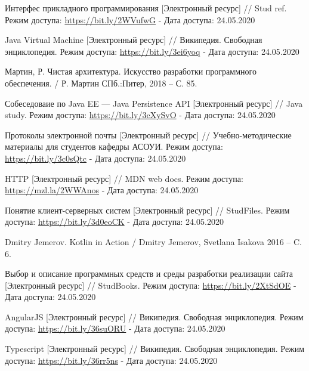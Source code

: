 \begingroup
\begin{thebibliography}{11}

    Интерфес прикладного программирования
    [Электронный ресурс] //
    Stud ref. 
    Режим доступа: \url{https://bit.ly/2WVufwG} -
    Дата доступа: 24.05.2020

    Java Virtual Machine
    [Электронный ресурс] //
    Википедия. Свободная энциклопедия. 
    Режим доступа: \url{https://bit.ly/3ei6yoq} -
    Дата доступа: 24.05.2020

    Мартин, Р.
    Чистая архитектура. Искусство разработки программного обеспечения. /
    Р. Мартин 
    СПб.:Питер, 2018 -- С. 85.

    Собеседоваие по Java EE --- Java Persistence API
    [Электронный ресурс] //
    Java study. 
    Режим доступа: \url{https://bit.ly/3cXySvO} -
    Дата доступа: 24.05.2020
    
    Протоколы электронной почты
    [Электронный ресурс] //
    Учебно-методические материалы для студентов кафедры АСОУИ. 
    Режим доступа: \url{https://bit.ly/3c0sQtc} -
    Дата доступа: 24.05.2020
    
    HTTP
    [Электронный ресурс] //
    MDN web docs. 
    Режим доступа: \url{https://mzl.la/2WWAnos} -
    Дата доступа: 24.05.2020

    Понятие клиент-серверных систем
    [Электронный ресурс] //
    StudFiles. 
    Режим доступа: \url{https://bit.ly/3d0eoCK} -
    Дата доступа: 24.05.2020

    Dmitry Jemerov.
    Kotlin in Action /
    Dmitry Jemerov, Svetlana Isakova
    2016 -- C. 6.

    Выбор и описание программных средств и среды разработки реализации сайта
    [Электронный ресурс] //
    StudBooks. 
    Режим доступа: \url{https://bit.ly/2XtSdOE} -
    Дата доступа: 24.05.2020

    AngularJS
    [Электронный ресурс] //
    Википедия. Свободная энциклопедия. 
    Режим доступа: \url{https://bit.ly/36suORU} -
    Дата доступа: 24.05.2020

    Typescript
    [Электронный ресурс] //
    Википедия. Свободная энциклопедия.
    Режим доступа: \url{https://bit.ly/36rr5ns} -
    Дата доступа: 24.05.2020

\end{thebibliography}
\endgroup

\clearpage